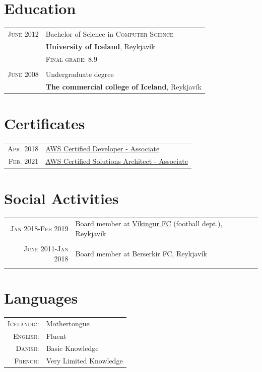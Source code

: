 \documentclass[a4paper,10pt]{article}
\begin{document}
\section{Education}
\begin{tabular}{rl}
 \textsc{June} 2012 & Bachelor of Science in \textsc{Computer Science}\\&\textbf{University of Iceland}, Reykjavík\\
&\normalsize \textsc{Final grade}: 8.9\\&\\

 \textsc{June} 2008 & Undergraduate degree\\&\textbf{The commercial college of Iceland}, Reykjavík
\end{tabular}

\section{Certificates}
\begin{tabular}{rl}
 \textsc{Apr.} 2018 & \href{https://aws.amazon.com/certification/certified-developer-associate/}{AWS Certified Developer - Associate}\\
 \textsc{Feb.} 2021 & \href{https://aws.amazon.com/certification/certified-solutions-architect-associate/}{AWS Certified Solutions Architect - Associate}
\end{tabular}



\section{Social Activities}
\begin{tabular}{r|p{10cm}}

 \textsc{Jan 2018-Feb 2019} & Board member at \href{www.vikingur.is}{Víkingur FC} (football dept.), Reykjavík \\\multicolumn{2}{c}{} \\

 \textsc{June 2011-Jan 2018} & Board member at Berserkir FC, Reykjavík \\\multicolumn{2}{c}{} \\

\end{tabular}
\section{Languages}
\begin{tabular}{rl}
 \textsc{Icelandic:}&Mothertongue\\
\textsc{English:}&Fluent\\
\textsc{Danish:}&Basic Knowledge\\
\textsc{French:}&Very Limited Knowledge\\
\end{tabular}
\end{document}
